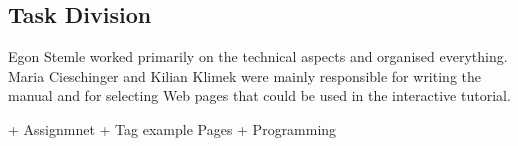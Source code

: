 \documentclass[12pt]{article}
\begin{document}



\subsection{Task Division}

Egon Stemle worked primarily on the technical aspects and organised everything. Maria Cieschinger and Kilian Klimek were mainly responsible for writing the manual and for selecting Web pages that could be used in the interactive tutorial.

+ Assignmnet
+ Tag example Pages
+ Programming

\nocite{*}

\footnotesize


\normalsize
\end{document}
